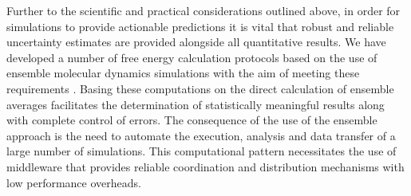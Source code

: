 Further to the scientific and practical considerations outlined above, in
order for simulations to provide actionable predictions it is vital that
robust and reliable uncertainty estimates are provided alongside all
quantitative results. We have developed a number of free energy calculation
protocols based on the use of ensemble molecular dynamics simulations with the
aim of meeting these requirements \cite{Sadiq2008, Sadiq2010, Wan2017brd4,
Wan2017trk}. Basing these computations on the direct calculation of ensemble
averages facilitates the determination of statistically meaningful results
along with complete control of errors. The consequence of the use of the
ensemble approach is the need to automate the execution, analysis and data
transfer of a large number of simulations. This computational pattern
necessitates the use of middleware that provides reliable coordination and
distribution mechanisms with low performance overheads.